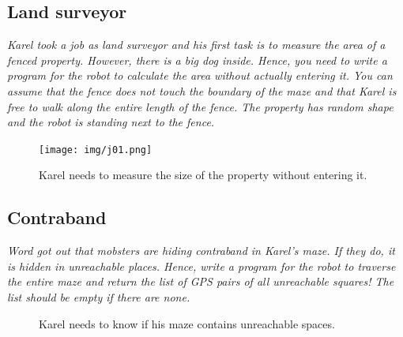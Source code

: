 \newpage
\subsection{Land surveyor}

\noindent
{\em Karel took a job as land surveyor and his first task is to measure the area of a fenced property. However, there is a big dog inside. Hence, you need to write a program for the robot to calculate the area without actually entering it. You can assume that the fence does not touch the boundary of the maze and that Karel is free to walk along the entire length of the fence. The property has random shape and the robot is standing next to the fence.}

\begin{figure}[!ht]
\begin{center}
\texttt{[image: img/j01.png]}
\end{center}
\vspace{-4mm}
\caption{Karel needs to measure the size of the property without entering it.}
\label{fig:j01}
\end{figure}

\newpage
\subsection{Contraband}

\noindent
{\em Word got out that mobsters are hiding contraband in Karel's maze. If they do, it is hidden in unreachable places. Hence, write a program for the robot to traverse the entire maze and return the list of GPS pairs of all unreachable squares! The list should be empty if there are none.}

\begin{figure}[!ht]
\begin{center}
\vspace{6cm}
\end{center}
\vspace{-4mm}
\caption{Karel needs to know if his maze contains unreachable spaces.}
\label{fig:j01b}
\end{figure}


